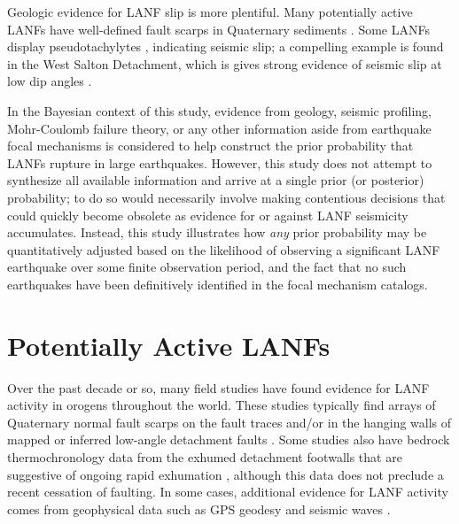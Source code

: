 \documentclass[draft,grl]{AGUTeX}
\begin{document}
\begin{article}
Geologic evidence for LANF slip is more plentiful. Many potentially active
LANFs have well-defined fault scarps in Quaternary sediments
\citep[e.g.,][]{styron2013slr, kapp2005nqtl, hayman2003dv, axen1999baja}. Some
LANFs display pseudotachylytes \citep[e.g.,][]{listerdavis1989}, indicating
seismic slip; a compelling example is found in the West Salton Detachment,
which is gives strong evidence of seismic slip at low dip angles
\citep{prante2014}.

In the Bayesian context of this study, evidence from geology, seismic
profiling, Mohr-Coulomb failure theory, or any other information aside from
earthquake focal mechanisms is considered to help construct the prior
probability that LANFs rupture in large earthquakes. However, this study does
not attempt to synthesize all available information and arrive at a single
prior (or posterior) probability; to do so would necessarily involve making
contentious decisions that could quickly become obsolete as evidence for or
against LANF seismicity accumulates. Instead, this study illustrates how
\emph{any} prior probability may be quantitatively adjusted based on the
likelihood of observing a significant LANF earthquake over some finite
observation period, and the fact that no such earthquakes have been
definitively identified in the focal mechanism catalogs.

\section{Potentially Active LANFs}

Over the past decade or so, many field studies have found evidence for LANF
activity in orogens throughout the world. These studies typically find arrays
of Quaternary normal fault scarps on the fault traces and/or in the hanging
walls of mapped or inferred low-angle detachment faults \citep [e.g.,]
[]{axen1999baja}. Some studies also have bedrock thermochronology data from the
exhumed detachment footwalls that are suggestive of ongoing rapid exhumation
\citep [e.g.,][]{sundell2013lunggar}, although this data does not preclude
a recent cessation of faulting. In some cases, additional evidence for LANF
activity comes from geophysical data such as GPS geodesy \citep [e.g.,]
[]{hreinsdottir2009altotib} and seismic waves \citep
[e.g.,][]{doser1987ancash}.


\end{article}
\end{document}
